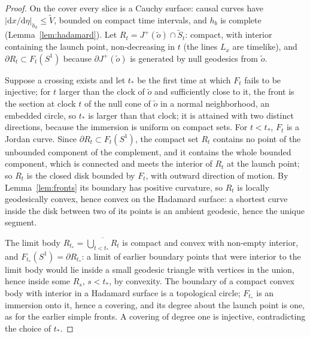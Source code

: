 \documentclass[aip,jmp,amsmath,amssymb,reprint]{revtex4-2}
\newcommand{\dd}{\mathrm{d}}
\theoremstyle{plain}
\theoremstyle{definition}
\begin{document}
\begin{proof}
On the cover every slice is a Cauchy surface: causal curves have
$|\dd x/\dd\eta|_{h_b}\le\tilde V$, bounded on compact time intervals, and $h_b$ is complete
(Lemma~\ref{lem:hadamard}). Let $R_t=J^+(\tilde o)\cap\tilde S_t$: compact, with interior
containing the launch point, non-decreasing in $t$ (the lines $L_x$ are timelike), and
$\partial R_t\subset F_t(S^1)$ because $\partial J^+(\tilde o)$ is generated by null
geodesics from $\tilde o$.

Suppose a crossing exists and let $t_*$ be the first time at which $F_t$ fails to be injective; for $t$ larger than the clock of $\tilde o$ and sufficiently close to it, the front is the section at clock $t$ of
the null cone of $\tilde o$ in a normal neighborhood, an embedded circle, so $t_*$ is larger than that clock; it is attained with two distinct directions, because the immersion is
uniform on compact sets. For $t<t_*$, $F_t$ is a Jordan curve. Since $\partial R_t\subset F_t(S^1)$, the compact set $R_t$ contains no
point of the unbounded component of the complement, and it contains the whole bounded component, which is connected
and meets the interior of $R_t$ at the launch point; so $R_t$ is the closed disk bounded by $F_t$, with outward
direction of motion. By Lemma~\ref{lem:fronts} its boundary has
positive curvature, so $R_t$ is locally geodesically convex, hence convex on the Hadamard
surface: a shortest curve inside the disk between two of its points is an ambient
geodesic, hence the unique segment.

The limit body $R_{t_*}=\overline{\bigcup_{t<t_*}R_t}$ is compact and convex with
non-empty interior, and $F_{t_*}(S^1)=\partial R_{t_*}$: a limit of earlier boundary
points that were interior to the limit body would lie inside a small geodesic triangle
with vertices in the union, hence inside some $R_s$, $s<t_*$, by convexity. The boundary
of a compact convex body with interior in a Hadamard surface is a topological circle;
$F_{t_*}$ is an immersion onto it, hence a covering, and its degree about the launch
point is one, as for the earlier simple fronts. A covering of degree one is injective,
contradicting the choice of $t_*$.
\end{proof}
\end{document}
